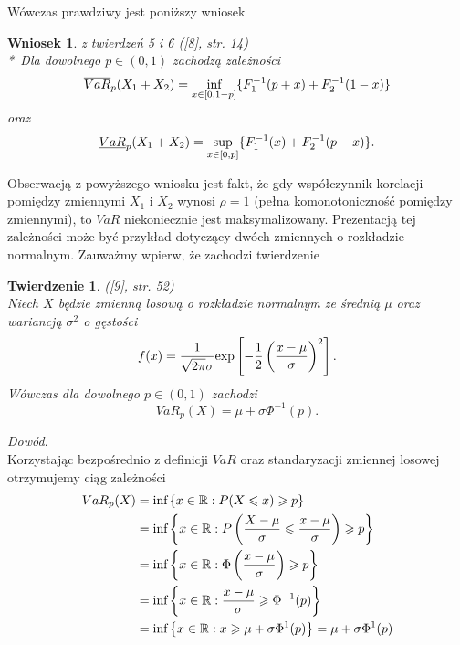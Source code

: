 \documentclass[12pt,a4paper,openany]{book}
\newtheorem{tw}{Twierdzenie}
\newtheorem*{wn*}{Wniosek}
\begin{document}
Wówczas prawdziwy jest poniższy wniosek

\begin{wn*}\textnormal{z twierdzeń 5 i 6}  \textnormal{([8], str. 14)}\\*\
Dla dowolnego $p \in (0,1)$ zachodzą zależności\\
\begin{gather}
\overline{VaR}_{p}(X_{1}+X_{2}) = \underset{x \in [0,1-p]}{\textnormal{inf}}\{F^{-1}_{1}(p+x) + F^{-1}_{2}(1-x)\}
\end{gather}
oraz 
\begin{gather}
\underline{VaR}_{p}(X_{1}+X_{2}) = \underset{x \in [0,p]}{\textnormal{sup}}\{F^{-1}_{1}(x) + F^{-1}_{2}(p-x)\}.
\end{gather}
\end{wn*}

Obserwacją z powyższego wniosku jest fakt, że gdy współczynnik korelacji pomiędzy zmiennymi $X_{1}$ i $X_{2}$ wynosi $\rho = 1$ (pełna komonotoniczność pomiędzy zmiennymi), to $VaR$ niekoniecznie jest maksymalizowany. Prezentacją tej zależności może być przykład dotyczący dwóch zmiennych o rozkładzie normalnym. Zauważmy wpierw, że zachodzi twierdzenie

\begin{tw}\textnormal{([9], str. 52)}\*\\
Niech $X$ będzie zmienną losową o rozkładzie normalnym ze średnią $\mu$ oraz wariancją $\sigma^{2}$ o gęstości
\begin{equation}
f(x) = \dfrac{1}{\sqrt{2\pi}\sigma}\textnormal{exp}\left[ -\dfrac{1}{2} \left(\dfrac{x-\mu}{\sigma} \right)^{2} \right]. \nonumber
\end{equation}
Wówczas dla dowolnego $p \in (0,1)$ zachodzi
\begin{equation}
VaR_{p}(X) = \mu + \sigma \Phi^{-1}(p). \nonumber
\end{equation}
\end{tw}

\noindent \textit{Dowód}.\\
\noindent Korzystając bezpośrednio z definicji $VaR$ oraz standaryzacji zmiennej losowej otrzymujemy ciąg zależności
\begin{gather}
\begin{split}
VaR_{p}(X) &= \textnormal{inf} \left\lbrace x \in \mathbb{R}: P(X \leqslant x) \geqslant p \right\rbrace \nonumber \\
					  &= \textnormal{inf} \left\lbrace x \in \mathbb{R}: P\left(\dfrac{X-\mu}{\sigma} \leqslant \dfrac{x-\mu}{\sigma}\right) \geqslant p \right\rbrace \nonumber \\
					  &= \textnormal{inf} \left\lbrace x \in \mathbb{R}: \Phi\left(\dfrac{x-\mu}{\sigma}\right) \geqslant p \right\rbrace \nonumber \\
					   &= \textnormal{inf} \left\lbrace x \in \mathbb{R}: \dfrac{x-\mu}{\sigma} \geqslant \Phi^{-1}(p) \right\rbrace \nonumber \\
					      &= \textnormal{inf} \left\lbrace x \in \mathbb{R}: x \geqslant \mu + \sigma \Phi^{1}(p) \right\rbrace = \mu + \sigma \Phi^{1}(p) \nonumber
\end{split}
\end{gather}
\end{document}
